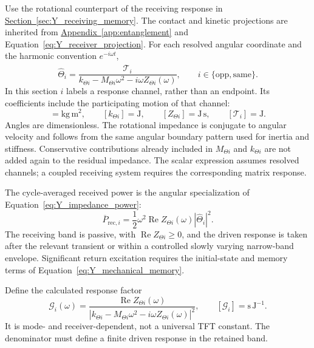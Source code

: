 Use the rotational counterpart of the receiving response in \hyperref[sec:Y_receiving_memory]{Section~\ref*{sec:Y_receiving_memory}}. The contact and kinetic projections are inherited from \hyperref[app:entanglement]{Appendix~\ref*{app:entanglement}} and Equation~\eqref{eq:Y_receiver_projection}. For each resolved angular coordinate and the harmonic convention $e^{-i\omega t}$,
\begin{equation}
    \widehat\Theta_i
    =\frac{\widehat{\mathcal T}_i}
    {k_{\Theta i}-M_{\Theta i}\omega^2-i\omega Z_{\Theta i}(\omega)},
    \qquad i\in\{\mathrm{opp},\mathrm{same}\}.
\end{equation}
In this section $i$ labels a response channel, rather than an endpoint. Its coefficients include the participating motion of that channel:
\begin{equation}
    [M_{\Theta i}]=\mathrm{kg\,m^2},
    \qquad [k_{\Theta i}]=\mathrm J,
    \qquad [Z_{\Theta i}]=\mathrm{J\,s},
    \qquad [\mathcal T_i]=\mathrm J.
\end{equation}
Angles are dimensionless. The rotational impedance is conjugate to angular velocity and follows from the same angular boundary pattern used for inertia and stiffness. Conservative contributions already included in $M_{\Theta i}$ and $k_{\Theta i}$ are not added again to the residual impedance. The scalar expression assumes resolved channels; a coupled receiving system requires the corresponding matrix response.

The cycle-averaged received power is the angular specialization of Equation~\eqref{eq:Y_impedance_power}:
\begin{equation}
    \boxed{
    \overline P_{\mathrm{rec},i}
    =\frac12\omega^2\operatorname{Re}Z_{\Theta i}(\omega)
     |\widehat\Theta_i|^2
    }.
\end{equation}
The receiving band is passive, with $\operatorname{Re}Z_{\Theta i}\geq0$, and the driven response is taken after the relevant transient or within a controlled slowly varying narrow-band envelope. Significant return excitation requires the initial-state and memory terms of Equation~\eqref{eq:Y_mechanical_memory}.

Define the calculated response factor
\begin{equation}
    \mathcal G_i(\omega)
    =\frac{\operatorname{Re}Z_{\Theta i}(\omega)}
    {\left|k_{\Theta i}-M_{\Theta i}\omega^2
                   -i\omega Z_{\Theta i}(\omega)\right|^2},
    \qquad [\mathcal G_i]=\mathrm{s\,J^{-1}}.
\end{equation}
It is mode- and receiver-dependent, not a universal TFT constant. The denominator must define a finite driven response in the retained band.

